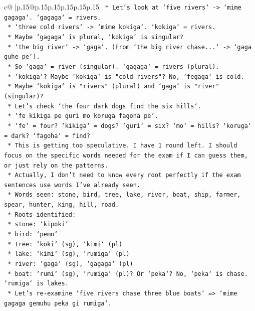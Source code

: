 \documentclass{article}
\begin{document}
{\begin{supertabular}{c@{$\;$}|p{.15\linewidth}@{}p{.15\linewidth}p{.15\linewidth}p{.15\linewidth}p{.15\linewidth}p{.15\linewidth}}
{{{\texttt{        *   Let's look at `five rivers` {-}> `mime gagaga`. `gagaga` = rivers.} \\
\texttt{        *   `three cold rivers` {-}> `mime kokiga`. `kokiga` = rivers.} \\
\texttt{        *   Maybe `gagaga` is plural, `kokiga` is singular?} \\
\texttt{        *   `the big river` {-}> `gaga`. (From `the big river chase...` {-}> `gaga guhe pe`).} \\
\texttt{        *   So `gaga` = river (singular). `gagaga` = rivers (plural).} \\
\texttt{        *   `kokiga`? Maybe `kokiga` is "cold rivers"? No, `fegaga` is cold.} \\
\texttt{        *   Maybe `kokiga` is "rivers" (plural) and `gaga` is "river" (singular)?} \\
\texttt{        *   Let's check `the four dark dogs find the six hills`.} \\
\texttt{        *   `fe kikiga pe guri mo koruga fagoha pe`.} \\
\texttt{        *   `fe` = four? `kikiga` = dogs? `guri` = six? `mo` = hills? `koruga` = dark? `fagoha` = find?} \\
\texttt{        *   This is getting too speculative. I have 1 round left. I should focus on the specific words needed for the exam if I can guess them, or just rely on the patterns.} \\
\texttt{        *   Actually, I don't need to know every root perfectly if the exam sentences use words I've already seen.} \\
\texttt{        *   Words seen: stone, bird, tree, lake, river, boat, ship, farmer, spear, hunter, king, hill, road.} \\
\texttt{        *   Roots identified:} \\
\texttt{            *   stone: `kipoki`} \\
\texttt{            *   bird: `pemo`} \\
\texttt{            *   tree: `koki` (sg), `kimi` (pl)} \\
\texttt{            *   lake: `kimi` (sg), `rumiga` (pl)} \\
\texttt{            *   river: `gaga` (sg), `gagaga` (pl)} \\
\texttt{            *   boat: `rumi` (sg), `rumiga` (pl)? Or `peka`? No, `peka` is chase. `rumiga` is lakes.} \\
\texttt{            *   Let's re{-}examine `five rivers chase three blue boats` => `mime gagaga gemuhu peka gi rumiga`.} \\
}}}
\end{supertabular}}
\end{document}

